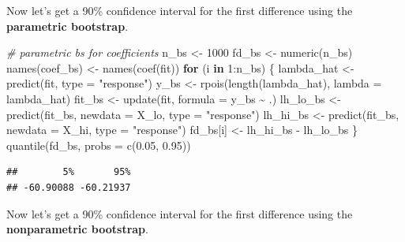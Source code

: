\documentclass[
]{book}
\newenvironment{Shaded}{\begin{snugshade}}{\end{snugshade}}
\newcommand{\AttributeTok}[1]{\textcolor[rgb]{0.77,0.63,0.00}{#1}}
\newcommand{\CommentTok}[1]{\textcolor[rgb]{0.56,0.35,0.01}{\textit{#1}}}
\newcommand{\ControlFlowTok}[1]{\textcolor[rgb]{0.13,0.29,0.53}{\textbf{#1}}}
\newcommand{\DecValTok}[1]{\textcolor[rgb]{0.00,0.00,0.81}{#1}}
\newcommand{\FloatTok}[1]{\textcolor[rgb]{0.00,0.00,0.81}{#1}}
\newcommand{\FunctionTok}[1]{\textcolor[rgb]{0.00,0.00,0.00}{#1}}
\newcommand{\NormalTok}[1]{#1}
\newcommand{\OtherTok}[1]{\textcolor[rgb]{0.56,0.35,0.01}{#1}}
\newcommand{\SpecialCharTok}[1]{\textcolor[rgb]{0.00,0.00,0.00}{#1}}
\newcommand{\StringTok}[1]{\textcolor[rgb]{0.31,0.60,0.02}{#1}}
\begin{document}
Now let's get a 90\% confidence interval for the first difference using the \textbf{parametric bootstrap}.

\begin{Shaded}
\begin{Highlighting}[]
\CommentTok{\# parametric bs for coefficients}
\NormalTok{n\_bs }\OtherTok{\textless{}{-}} \DecValTok{1000}
\NormalTok{fd\_bs }\OtherTok{\textless{}{-}} \FunctionTok{numeric}\NormalTok{(n\_bs)}
\FunctionTok{names}\NormalTok{(coef\_bs) }\OtherTok{\textless{}{-}} \FunctionTok{names}\NormalTok{(}\FunctionTok{coef}\NormalTok{(fit))}
\ControlFlowTok{for}\NormalTok{ (i }\ControlFlowTok{in} \DecValTok{1}\SpecialCharTok{:}\NormalTok{n\_bs) \{}
\NormalTok{  lambda\_hat }\OtherTok{\textless{}{-}} \FunctionTok{predict}\NormalTok{(fit, }\AttributeTok{type =} \StringTok{"response"}\NormalTok{)}
\NormalTok{  y\_bs }\OtherTok{\textless{}{-}} \FunctionTok{rpois}\NormalTok{(}\FunctionTok{length}\NormalTok{(lambda\_hat),  }\AttributeTok{lambda =}\NormalTok{ lambda\_hat)}
\NormalTok{  fit\_bs }\OtherTok{\textless{}{-}} \FunctionTok{update}\NormalTok{(fit, }\AttributeTok{formula =}\NormalTok{ y\_bs }\SpecialCharTok{\textasciitilde{}}\NormalTok{ .)}
\NormalTok{  lh\_lo\_bs }\OtherTok{\textless{}{-}} \FunctionTok{predict}\NormalTok{(fit\_bs, }\AttributeTok{newdata =}\NormalTok{ X\_lo, }\AttributeTok{type =} \StringTok{"response"}\NormalTok{)}
\NormalTok{  lh\_hi\_bs }\OtherTok{\textless{}{-}} \FunctionTok{predict}\NormalTok{(fit\_bs, }\AttributeTok{newdata =}\NormalTok{ X\_hi, }\AttributeTok{type =} \StringTok{"response"}\NormalTok{)}
\NormalTok{  fd\_bs[i] }\OtherTok{\textless{}{-}}\NormalTok{ lh\_hi\_bs }\SpecialCharTok{{-}}\NormalTok{ lh\_lo\_bs}
\NormalTok{\}}
\FunctionTok{quantile}\NormalTok{(fd\_bs, }\AttributeTok{probs =} \FunctionTok{c}\NormalTok{(}\FloatTok{0.05}\NormalTok{, }\FloatTok{0.95}\NormalTok{))}
\end{Highlighting}
\end{Shaded}

\begin{verbatim}
##        5%       95% 
## -60.90088 -60.21937
\end{verbatim}

Now let's get a 90\% confidence interval for the first difference using the \textbf{nonparametric bootstrap}.
\end{document}
